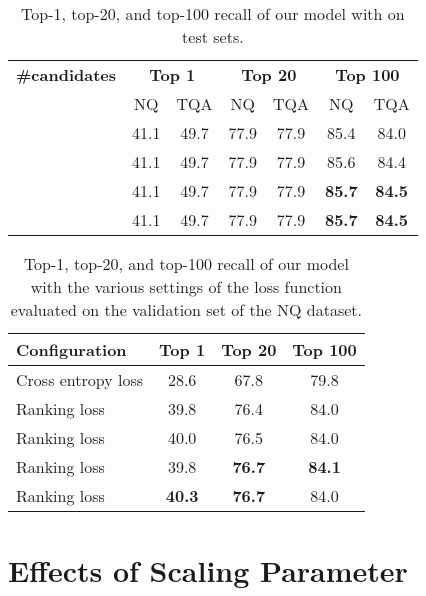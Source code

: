 \documentclass[11pt,a4paper]{article}
\begin{document}
\begin{table}[t]
  \centering
  \setlength{\tabcolsep}{5pt}
  \small{
    \begin{tabular}{l|cc|cc|cc}
      \toprule
      \textbf{\#candidates}                     & \multicolumn{2}{c|}{\textbf{Top 1}} & \multicolumn{2}{c|}{\textbf{Top 20}} & \multicolumn{2}{c}{\textbf{Top 100}} \\
                                         & NQ                                  & TQA                                  & NQ                                    & TQA                                      & NQ            & TQA \\
      \midrule
              & 41.1 & 49.7 & 77.9 & 77.9 & 85.4 & 84.0 \\
              & 41.1 & 49.7 & 77.9 & 77.9 & 85.6 & 84.4 \\
             & 41.1 & 49.7 & 77.9 & 77.9 & \textbf{85.7} & \textbf{84.5} \\
             & 41.1 & 49.7 & 77.9 & 77.9 & \textbf{85.7} & \textbf{84.5} \\
      \bottomrule
    \end{tabular}
    \caption{Top-1, top-20, and top-100 recall of our model with  on test sets.}
   \label{tb:number-of-candidates}
  }
\end{table}

\begin{table}[t]
  \centering
  \small{
    \begin{tabular}{l|ccc}
      \toprule
      \textbf{Configuration}    & \textbf{Top 1} & \textbf{Top 20} & \textbf{Top 100} \\
      \midrule
      Cross entropy loss        & 28.6 & 67.8 & 79.8 \\
      \midrule
      Ranking loss  & 39.8 & 76.4 & 84.0 \\
      Ranking loss  & 40.0 & 76.5 & 84.0 \\
      Ranking loss  & 39.8 & \textbf{76.7} & \textbf{84.1} \\
      Ranking loss  & \textbf{40.3} & \textbf{76.7} & 84.0 \\
      \bottomrule
    \end{tabular}
    \caption{Top-1, top-20, and top-100 recall of our model with the various settings of the loss function  evaluated on the validation set of the NQ dataset.}
   \label{tb:binary-loss}
  }
\end{table}

\section{Effects of Scaling Parameter}
\label{sec:effects-gamma}
\end{document}
